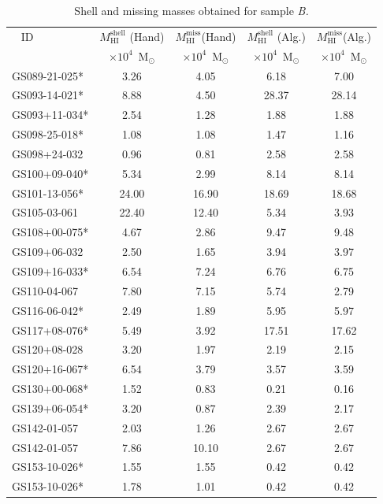 \documentclass{aa}
\begin{document}
\begin{table}
\caption{Shell and missing masses obtained for sample \it {B}.} 
\label{massesB}
\centering  
\begin{tabular}{l c c c c }
\hline \hline
   \,\,\, ID & $M_{\mathrm{HI}}^{\mathrm{shell}}$ (Hand)  &  $M_{\mathrm{HI}}^{\mathrm{miss}} $(Hand)& $M_{\mathrm{HI}}^{\mathrm{shell}}$ (Alg.)  &  $M_{\mathrm{HI}}^{\mathrm{miss}} $(Alg.)\\
  & $\times 10^4$\, M$_\odot$ &  $\times 10^4$\, M$_\odot$ & $\times 10^4$\, M$_\odot$ & $\times 10^4$\, M$_\odot$ \\
\hline
  GS089-21-025*   	&	3.26	&	4.05	&	6.18	&	7.00	\\
  GS093-14-021*   	&	8.88	&	4.50	&	28.37	&	28.14	\\
  GS093+11-034*   	&	2.54	&	1.28	&	1.88	&	1.88	\\
  GS098-25-018*   	&	1.08	&	1.08	&	1.47	&	1.16	\\
  GS098+24-032   	&	0.96	&	0.81	&	2.58	&	2.58	\\
  GS100+09-040*   	&	5.34	&	2.99	&	8.14	&	8.14	\\
  GS101-13-056*   	&	24.00	&	16.90	&	18.69	&	18.68	\\
  GS105-03-061   	&	22.40	&	12.40	&	5.34	&	3.93	\\
  GS108+00-075*   	&	4.67	&	2.86	&	9.47	&	9.48	\\
  GS109+06-032   	&	2.50	&	1.65	&	3.94	&	3.97	\\
  GS109+16-033*   	&	6.54	&	7.24	&	6.76	&	6.75	\\
  GS110-04-067   	&	7.80	&	7.15	&	5.74	&	2.79	\\
  GS116-06-042*   	&	2.49	&	1.89	&	5.95	&	5.97	\\
  GS117+08-076*   	&	5.49	&	3.92	&	17.51	&	17.62	\\
  GS120+08-028   	&	3.20	&	1.97	&	2.19	&	2.15	\\
  GS120+16-067*   	&	6.54	&	3.79	&	3.57	&	3.59	\\
  GS130+00-068*   	&	1.52	&	0.83	&	0.21	&	0.16	\\
  GS139+06-054*   	&	3.20	&	0.87	&	2.39	&	2.17	\\
  GS142-01-057   	&	2.03	&	1.26	&	2.67	&	2.67	\\
  GS142-01-057   	&	7.86	&	10.10	&	2.67	&	2.67	\\
  GS153-10-026*   	&	1.55	&	1.55	&	0.42	&	0.42	\\
  GS153-10-026*   	&	1.78	&	1.01	&	0.42	&	0.42	\\

\end{tabular}
\end{table}
\end{document}
